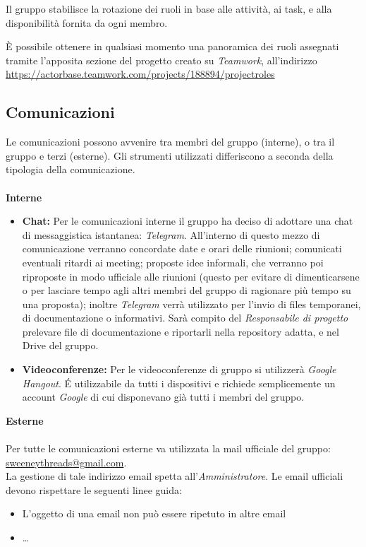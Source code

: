 \documentclass[a4paper]{report}
\begin{document}
	Il gruppo stabilisce la rotazione dei ruoli in base alle attività, ai task, e alla disponibilità fornita da ogni membro.
	
	È possibile ottenere in qualsiasi momento una panoramica dei ruoli assegnati tramite l'apposita sezione del 
	progetto creato su \emph{Teamwork}, all'indirizzo\\ \url{https://actorbase.teamwork.com/projects/188894/projectroles} 
	\subsection{Comunicazioni}
	\label{sec:Comunicazioni}
	Le comunicazioni possono avvenire tra membri del gruppo (interne), o tra il gruppo e terzi (esterne). Gli
	strumenti utilizzati differiscono a seconda della tipologia della comunicazione. \\ \\
	\textbf{Interne} 
	\begin{itemize}
		\item \textbf{Chat:} Per le comunicazioni interne il gruppo ha deciso di adottare una chat di messaggistica 
		istantanea: \emph{Telegram}. All'interno di questo mezzo di comunicazione verranno concordate date e orari 
		delle riunioni; comunicati eventuali ritardi ai meeting; proposte idee informali, che verranno poi riproposte 
		in modo ufficiale alle riunioni (questo per evitare di dimenticarsene o per lasciare tempo agli altri membri 
		del gruppo di ragionare più tempo su una proposta); inoltre \emph{Telegram} verrà utilizzato per l'invio di files
		temporanei, di documentazione o informativi. Sarà compito del \emph{Responsabile di progetto} prelevare file di documentazione 
		e riportarli nella repository adatta, e nel Drive del gruppo.
		\item \textbf{Videoconferenze:} Per le videoconferenze di gruppo si utilizzerà \emph{Google Hangout}. 
		\'E utilizzabile da tutti i dispositivi e richiede semplicemente un account \emph{Google} di cui disponevano 
		già tutti i membri del gruppo.
	\end{itemize}
	\textbf{Esterne}  \\ \\ 
	Per tutte le comunicazioni esterne va utilizzata la mail ufficiale del gruppo: \href{mailto:sweeneythreads@gmail.com}%
	{sweeneythreads@gmail.com}. \\ La gestione di 
	tale indirizzo email spetta all'\emph{Amministratore}. Le email ufficiali devono rispettare le seguenti linee guida:
	\begin{itemize}
		\item L'oggetto di una email non può essere ripetuto in altre email
		\item \dots
	\end{itemize}										
\end{document}
